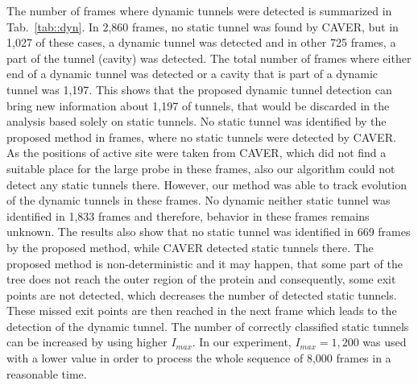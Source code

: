 \documentclass[usletter, 10pt, conference]{svjour3}      %
\def\Imax{I_{max}} %
\begin{document}
The number of frames where dynamic tunnels were detected is summarized in Tab.~\ref{tab::dyn}.
In 2,860 frames, no static tunnel was found by CAVER, but  in 1,027 of these cases, a dynamic tunnel was detected and
in other 725 frames, a part of the tunnel (cavity) was detected.
The total number of frames where either end of a dynamic tunnel was detected or a cavity that is part of a dynamic tunnel was
1,197.
This shows that the proposed dynamic tunnel detection can bring new information about 1,197 of tunnels, that would be 
discarded in the analysis based solely on static tunnels.
No static tunnel was identified by the proposed method in frames, where no static tunnels were detected by CAVER.
As the positions of active site were taken from CAVER, which did not find a suitable place for the large probe in these frames,
also our algorithm could not detect any static tunnels there.
However, our method was able to track evolution of the dynamic tunnels in these frames.
No dynamic neither static tunnel was identified in 1,833 frames and therefore, behavior in these frames  remains unknown.
The results also show that no static tunnel was identified in 669 frames by the proposed method, while CAVER detected static tunnels there.
%
%
The proposed method is non-deterministic and it may happen, that some part of the tree does not reach the outer region of the protein and consequently, some exit points are not detected, which decreases the number of detected static tunnels.
These missed exit points are then reached in the next frame which leads to the detection of the dynamic tunnel.
The number of correctly classified static tunnels can be increased by using higher $\Imax$.
In our experiment, $\Imax=1,200$ was used with a lower value in order to process the whole sequence of 8,000 frames in a reasonable time.
\end{document}
